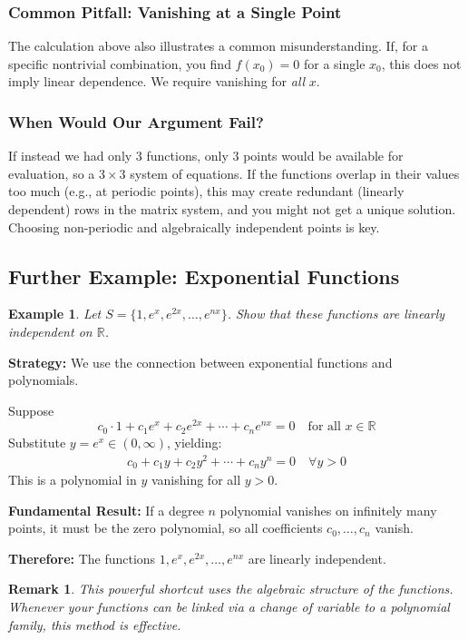 \documentclass[12pt]{article}
\newtheorem{remark}[theorem]{Remark}
\newtheorem{example}[theorem]{Example}
\begin{document}
\subsubsection*{Common Pitfall: Vanishing at a Single Point}

The calculation above also illustrates a common misunderstanding. If, for a specific nontrivial combination, you find $f(x_0) = 0$ for a single $x_0$, this does not imply linear dependence. We require vanishing for \emph{all} $x$.

\subsubsection*{When Would Our Argument Fail?}
If instead we had only $3$ functions, only $3$ points would be available for evaluation, so a $3\times 3$ system of equations. If the functions overlap in their values too much (e.g., at periodic points), this may create redundant (linearly dependent) rows in the matrix system, and you might not get a unique solution. Choosing non-periodic and algebraically independent points is key.

\subsection{Further Example: Exponential Functions}
\begin{example}
Let $S = \{1, e^x, e^{2x}, \dotsc, e^{n x}\}$. Show that these functions are linearly independent on $\mathbb{R}$.
\end{example}

\textbf{Strategy:} We use the connection between exponential functions and polynomials.

Suppose
\[
c_0 \cdot 1 + c_1 e^x + c_2 e^{2x} + \cdots + c_n e^{n x} = 0 \quad \text{for all } x \in \mathbb{R}
\]
Substitute $y = e^x \in (0,\infty)$, yielding:
\begin{align*}
c_0 + c_1 y + c_2 y^2 + \cdots + c_n y^n = 0 \quad \forall y > 0
\end{align*}
This is a polynomial in $y$ vanishing for all $y > 0$.

\textbf{Fundamental Result:} If a degree $n$ polynomial vanishes on infinitely many points, it must be the zero polynomial, so all coefficients $c_0, \ldots, c_n$ vanish.

\textbf{Therefore:} The functions $1, e^x, e^{2x}, \dotsc, e^{n x}$ are linearly independent.

\begin{remark}
This powerful shortcut uses the algebraic structure of the functions. Whenever your functions can be linked via a change of variable to a polynomial family, this method is effective.
\end{remark}
\end{document}
